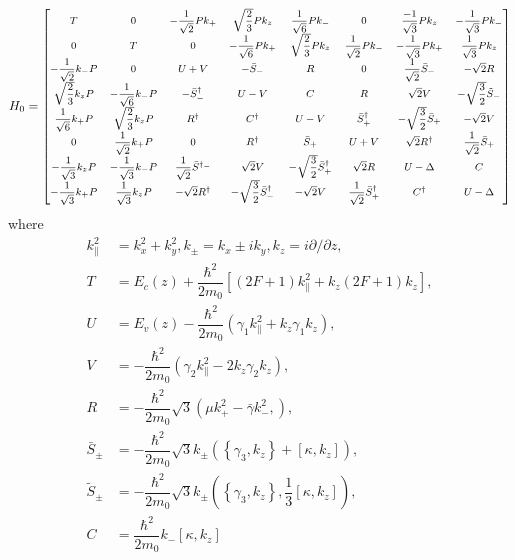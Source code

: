 \begin{equation}\label{eqn:chapter-2:section-numerical-calculations-8x8-hamiltonian}
  H_{0}={\footnotesize\begin{bmatrix}
T & 0  &-\dfrac{1}{\sqrt{2}}Pk_{+}& \sqrt{\dfrac{2}{3}} Pk_{z}   & \dfrac{1}{\sqrt{6}}Pk_{-} & 0 & \dfrac{-1}{\sqrt{3}}Pk_{z} & -\dfrac{1}{\sqrt{3}}Pk_{-}\\

0 & T & 0& -\dfrac{1}{\sqrt{6}}Pk_{+}& \sqrt{\dfrac{2}{3}} Pk_{z}& \dfrac{1}{\sqrt{2}}Pk_{-}  &-\dfrac{1}{\sqrt{3}}Pk_{+}& \dfrac{1}{\sqrt{3}}Pk_{z}\\

-\dfrac{1}{\sqrt{2}}k_{-}P & 0 & U+V & -\bar{S}_{-} & R & 0 & \dfrac{1}{\sqrt{2}}\bar{S}_{-} & -\sqrt{2}R\\

\sqrt{\dfrac{2}{3}} k_{z}P&-\dfrac{1}{\sqrt{6}}k_{-}P& -\bar{S}^{\dagger}_{-}&U-V&C&R&\sqrt{2}V&-\sqrt{\dfrac{3}{2}}\tilde{S}_{-}\\
\dfrac{1}{\sqrt{6}}k_{+}P & \sqrt{\dfrac{2}{3}}k_{z}P&R^{\dagger}&C^{\dagger}&U-V&\bar{S}^{\dagger}_{+}&-\sqrt{\dfrac{3}{2}}\bar{S}_{+}&-\sqrt{2}V\\
0&\dfrac{1}{\sqrt{2}}k_{+}P&0&R^{\dagger}&\bar{S}_{+}&U+V&\sqrt{2}R^{\dagger}&\dfrac{1}{\sqrt{2}}\bar{S}_{+}\\
-\dfrac{1}{\sqrt{3}}k_{z}P&-\dfrac{1}{\sqrt{3}}k_{-}P&\dfrac{1}{\sqrt{2}}\bar{S}^{\dagger_{-}}&\sqrt{2}V&-\sqrt{\dfrac{3}{2}}\bar{S}^{\dagger}_{+}&\sqrt{2}R&U-\Delta&C\\
-\dfrac{1}{\sqrt{3}}k_{+}P&\dfrac{1}{\sqrt{3}}k_{z}P&-\sqrt{2}R^{\dagger}&-\sqrt{\dfrac{3}{2}}\bar{S}^{\dagger}_{-}&-\sqrt{2}V&\dfrac{1}{\sqrt{2}}\bar{S}^{\dagger}_{+}&C^{\dagger}&U-\Delta\\
\end{bmatrix}}
\end{equation}
where 
\begin{align*}
	k^{2}_{\parallel}&=k_{x}^{2}+k^{2}_{y},  k_{\pm}=k_{x}\pm ik_{y},  k_{z}=i\partial/\partial z,\\
	T&=E_{c}(z)+\dfrac{\hbar^{2}}{2m_{0}}\left[(2F+1)k^{2}_{\parallel}+k_{z}(2F+1)k_{z}\right], \\
	U&=E_{v}(z)-\dfrac{\hbar^{2}}{2m_{0}}\left(\gamma_{1}k^{2}_{\parallel}+k_{z}\gamma_{1}k_{z} \right),\\ 
	V&=-\dfrac{\hbar^{2}}{2m_{0}}\left(\gamma_{2}k^{2}_{\parallel}-2k_{z}\gamma_{2}k_{z}\right),\\ 
	R&=-\dfrac{\hbar^{2}}{2m_{0}}\sqrt{3}\left(\mu k^{2}_{+}-\bar{\gamma}k^{2}_{-},\right),\\
	\bar{S}_{\pm}&=-\dfrac{\hbar^{2}}{2m_{0}}\sqrt{3}k_{\pm}\left(\left\lbrace\gamma_{3},k_{z}\right\rbrace+\left[\kappa,k_{z}\right]\right),\\
	\tilde{S}_{\pm}&=-\dfrac{\hbar^{2}}{2m_{0}}\sqrt{3}k_{\pm}\left(\left\lbrace\gamma_{3},k_{z}\right\rbrace,\dfrac{1}{3}\left[\kappa,k_{z}\right]\right),\\
	C&=\dfrac{\hbar^{2}}{2m_{0}}k_{-}\left[\kappa,k_{z}\right]
\end{align*}

